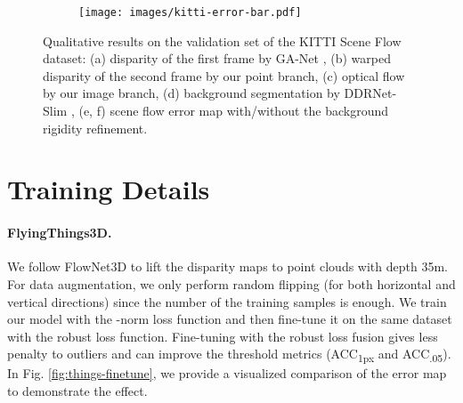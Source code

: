 \documentclass[10pt,twocolumn,letterpaper]{article}
\begin{document}
\begin{figure*}
    \vspace{-3pt}
    \begin{subfigure}[b]{0.02\linewidth}
        \centering
    \end{subfigure}\hfill
    \begin{subfigure}[b]{0.956\linewidth}
        \texttt{[image: images/kitti-error-bar.pdf]}
    \end{subfigure}\hfill
    \begin{subfigure}[b]{0.02\linewidth}
        \centering
    \end{subfigure}\hfill

    \caption{Qualitative results on the validation set of the KITTI Scene Flow dataset: (a) disparity of the first frame by GA-Net \cite{zhang2019ganet}, (b) warped disparity of the second frame by our point branch, (c) optical flow by our image branch, (d) background segmentation by DDRNet-Slim \cite{hong2021ddrnet}, (e, f) scene flow error map with/without the background rigidity refinement.}
    \label{fig:more-kitti-val}
\end{figure*}

\section{Training Details}

\paragraph{FlyingThings3D.} We follow FlowNet3D \cite{liu2019flownet3d} to lift the disparity maps to point clouds with depth 35m. For data augmentation, we only perform random flipping (for both horizontal and vertical directions) since the number of the training samples is enough. We train our model with the -norm loss function and then fine-tune it on the same dataset with the robust loss function. Fine-tuning with the robust loss fusion gives less penalty to outliers and can improve the threshold metrics (ACC\textsubscript{1px} and ACC\textsubscript{.05}). In Fig. \ref{fig:things-finetune}, we provide a visualized comparison of the error map to demonstrate the effect.
\end{document}
